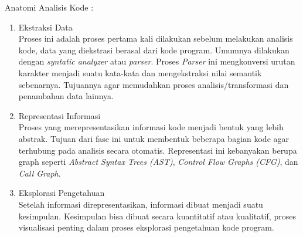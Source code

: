 Anatomi Analisis Kode \cite{208}:
\begin{enumerate}[leftmargin=1.3cm]
	\item Ekstraksi Data\\
	Proses ini adalah proses pertama kali dilakukan sebelum melakukan analisis kode, data yang diekstrasi berasal dari kode program. Umumnya dilakukan dengan \textit{syntatic analyzer} atau \textit{parser}. Proses \textit{Parser} ini mengkonversi urutan karakter menjadi suatu kata-kata dan mengekstraksi nilai semantik sebenarnya. Tujuannya agar memudahkan proses analisis/transformasi dan penambahan data lainnya.
	\item Representasi Informasi\\
	Proses yang merepresentasikan informasi kode menjadi bentuk yang lebih abstrak. Tujuan dari fase ini untuk membentuk beberapa bagian kode agar terhubung pada analisis secara otomatis. Representasi ini kebanyakan berupa graph seperti \textit{Abstract Syntax Trees (AST)}, \textit{Control Flow Graphs (CFG)}, dan \textit{Call Graph}.
	\item Eksplorasi Pengetahuan\\
	Setelah informasi direpresentasikan, informasi dibuat menjadi suatu kesimpulan. Kesimpulan bisa dibuat secara kuantitatif atau kualitatif, proses visualisasi penting dalam proses eksplorasi pengetahuan kode program.
\end{enumerate}

